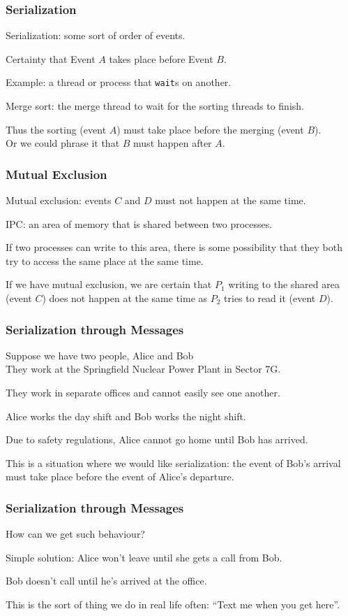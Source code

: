 \begin{frame}
\frametitle{Serialization}

\alert{Serialization}: some sort of order of events.

Certainty that Event $A$ takes place before Event $B$. 

Example: a thread or process that \texttt{wait}s on another. 

Merge sort: the merge thread to wait for the sorting threads to finish. 

Thus the sorting (event $A$) must take place before the merging (event $B$).\\
\quad Or we could phrase it that $B$ must happen after $A$.


\end{frame}

\begin{frame}
\frametitle{Mutual Exclusion}

\alert{Mutual exclusion}: events $C$ and $D$ must not happen at the same time. 

IPC: an area of memory that is shared between two processes. 

If two processes can write to this area, there is some possibility that they both try to access the same place at the same time. 

If we have mutual exclusion, we are certain that $P_{1}$ writing to the shared area (event $C$) does not happen at the same time as $P_{2}$ tries to read it (event $D$).

\end{frame}

\begin{frame}
\frametitle{Serialization through Messages}

Suppose we have two people, Alice and Bob\\
\quad They work at the Springfield Nuclear Power Plant in Sector 7G.

They work in separate offices and cannot easily see one another. 

Alice works the day shift and Bob works the night shift.

Due to safety regulations, Alice cannot go home until Bob has arrived. 

This is a situation where we would like serialization: the event of Bob's arrival must take place before the event of Alice's departure. 

\end{frame}

\begin{frame}
\frametitle{Serialization through Messages}

How can we get such behaviour? 

Simple solution: Alice won't leave until she gets a call from Bob. 

Bob doesn't call until he's arrived at the office. 

This is the sort of thing we do in real life often: ``Text me when you get here''.



\end{frame}

